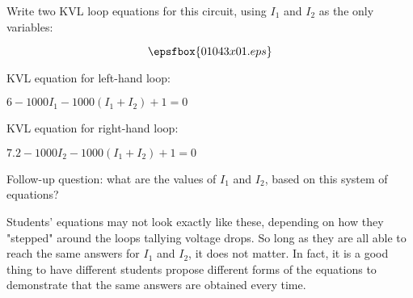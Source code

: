 

Write two KVL loop equations for this circuit, using $I_1$ and $I_2$ as the only variables:

$$\epsfbox{01043x01.eps}$$







KVL equation for left-hand loop:

$6 - 1000I_1 - 1000(I_1 + I_2) + 1 = 0$

\vskip 10pt

KVL equation for right-hand loop:

$7.2 - 1000I_2 - 1000(I_1 + I_2) + 1 = 0$

\vskip 10pt

Follow-up question: what are the values of $I_1$ and $I_2$, based on this system of equations?







Students' equations may not look exactly like these, depending on how they "stepped" around the loops tallying voltage drops.  So long as they are all able to reach the same answers for $I_1$ and $I_2$, it does not matter.  In fact, it is a good thing to have different students propose different forms of the equations to demonstrate that the same answers are obtained every time.



